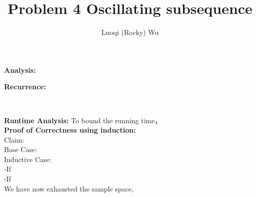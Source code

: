 \documentclass[12pt]{article}
\title{Problem 4 Oscillating subsequence}
\author{Luoqi (Rocky) Wu}
\begin{document}
\maketitle

\textbf{Analysis:}

\textbf{Recurrence:}


\pagebreak

\begin{algorithm}
\caption{}
\KwIn{}
\KwOut{}
\hrulefill\\

\nl \tcp*[r]{}
\nl 

\nl {} {
    \nl {}
        }
\nl \Return{}
\end{algorithm}

\pagebreak

\textbf{Runtime Analysis:} To bound the running time， \\

\textbf{Proof of Correctness using induction:} \\

Claim: \\

Base Case: \\

Inductive Case: \\

-If \\

-If \\

We have now exhausted the sample space, \\
\end{document}
